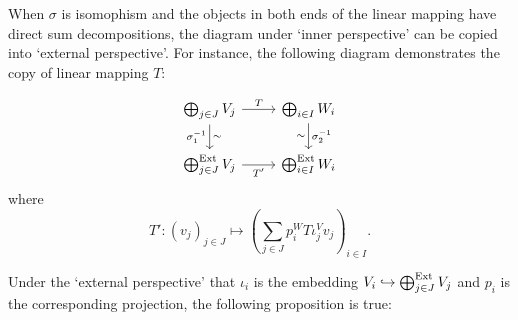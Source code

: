 When $\sigma$ is isomophism and the objects in both ends of the linear mapping have direct sum decompositions, the diagram under `inner perspective' can be copied into `external perspective'. For instance, the following diagram demonstrates the copy of linear mapping $T$:

\[
    \begin{tikzcd}
        \bigoplus_{j \in J} V_j  \arrow[r, "T"]  \arrow[d, "\sigma_{1}^{-1}"', "\sim"]
        &
        \bigoplus_{i \in I} W_i \arrow[d, "\sigma_{2}^{-1}", "\sim"']
        \\
        \bigoplus_{j \in J}^{\Ext} V_j \arrow[r, "T'"'] 
        & \bigoplus_{i \in I}^{\Ext} W_i 
    \end{tikzcd}
\]
where
\[
    T' : (v_j)_{j \in J} \mapsto \left( \sum_{j \in J} p_i^{W} T \iota_j^{V} v_j \right)_{i \in I}.
\]







Under the `external perspective' that $\iota_i$ is the embedding $V_i \hookrightarrow \bigoplus^{\mathrm{Ext}}_{j \in J} V_j$ and $p_i$ is the corresponding projection, the following proposition is true:


